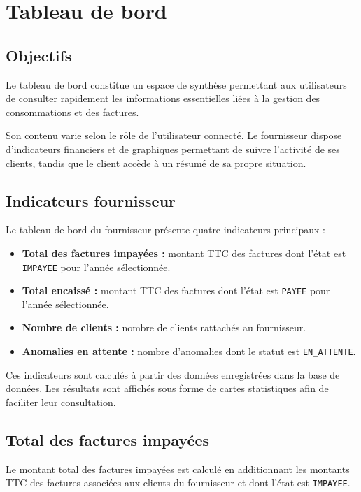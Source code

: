 
\chapter{Tableau de bord}
\label{chap:dashboard}

\section{Objectifs}

Le tableau de bord constitue un espace de synthèse permettant aux utilisateurs de consulter rapidement les informations essentielles liées à la gestion des consommations et des factures.

Son contenu varie selon le rôle de l'utilisateur connecté. Le fournisseur dispose d'indicateurs financiers et de graphiques permettant de suivre l'activité de ses clients, tandis que le client accède à un résumé de sa propre situation.

\section{Indicateurs fournisseur}

Le tableau de bord du fournisseur présente quatre indicateurs principaux :

\begin{itemize}
    \item \textbf{Total des factures impayées :} montant TTC des factures dont l'état est \texttt{IMPAYEE} pour l'année sélectionnée.
    \item \textbf{Total encaissé :} montant TTC des factures dont l'état est \texttt{PAYEE} pour l'année sélectionnée.
    \item \textbf{Nombre de clients :} nombre de clients rattachés au fournisseur.
    \item \textbf{Anomalies en attente :} nombre d'anomalies dont le statut est \texttt{EN\_ATTENTE}.
\end{itemize}

Ces indicateurs sont calculés à partir des données enregistrées dans la base de données. Les résultats sont affichés sous forme de cartes statistiques afin de faciliter leur consultation.

\section{Total des factures impayées}

Le montant total des factures impayées est calculé en additionnant les montants TTC des factures associées aux clients du fournisseur et dont l'état est \texttt{IMPAYEE}.

